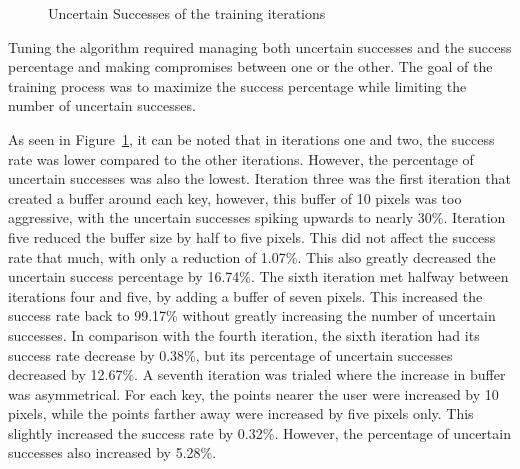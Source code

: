 \documentclass{report}
\begin{document}
\begin{figure}[H]
	\centering
	\caption{Uncertain Successes of the training iterations}
	\label{fig:rd-training-uncertain-successes-vs-success}
\end{figure}


Tuning the algorithm required managing both uncertain successes and the success
percentage and making compromises between one or the other. The goal of the
training process was to maximize the success percentage while limiting the
number of uncertain successes.

As seen in Figure~\ref{fig:rd-training-uncertain-successes-vs-success}, it can
be noted that in iterations one and two, the success rate was lower compared to
the other iterations. However, the percentage of uncertain successes was also
the lowest. Iteration three was the first iteration that created a buffer around
each key, however, this buffer of 10 pixels was too aggressive, with the
uncertain successes spiking upwards to nearly 30\%. Iteration five reduced the
buffer size by half to five pixels. This did not affect the success rate that
much, with only a reduction of 1.07\%. This also greatly decreased the uncertain
success percentage by 16.74\%. The sixth iteration met halfway between
iterations four and five, by adding a buffer of seven pixels. This increased the
success rate back to 99.17\% without greatly increasing the number of uncertain
successes. In comparison with the fourth iteration, the sixth iteration had its
success rate decrease by 0.38\%, but its percentage of uncertain successes
decreased by 12.67\%. A seventh iteration was trialed where the increase in
buffer was asymmetrical. For each key, the points nearer the user were increased
by 10 pixels, while the points farther away were increased by five pixels only.
This slightly increased the success rate by 0.32\%. However, the percentage of
uncertain successes also increased by 5.28\%.
\end{document}

